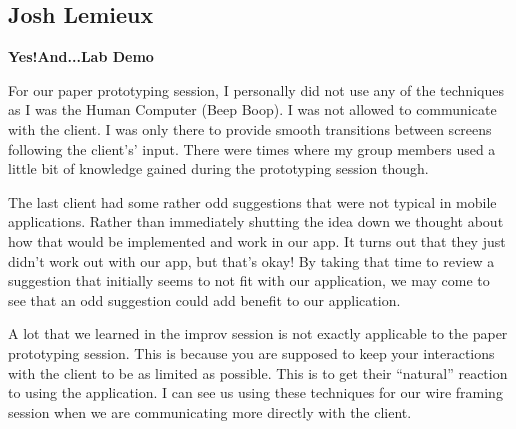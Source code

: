 \documentclass[12pt,letterpaper]{article}
\begin{document}
\subsection{Josh Lemieux}
\textbf{Yes!And...Lab Demo}\par
For our paper prototyping session, I personally did not use any of the techniques as I was the Human Computer (Beep Boop). I was not allowed to communicate with the client. I was only there to provide smooth transitions between screens following the client's’ input. There were times where my group members used a little bit of knowledge gained during the prototyping session though.\par
	The last client had some rather odd suggestions that were not typical in mobile applications. Rather than immediately shutting the idea down we thought about how that would be implemented and work in our app. It turns out that they just didn’t work out with our app, but that’s okay! By taking that time to review a suggestion that initially seems to not fit with our application, we may come to see that an odd suggestion could add benefit to our application.\par
      	A lot that we learned in the improv session is not exactly applicable to the paper prototyping session. This is because you are supposed to keep your interactions with the client to be as limited as possible. This is to get their “natural” reaction to using the application. I can see us using these techniques for our wire framing session when we are communicating more directly with the client.


\clearpage
\end{document}
